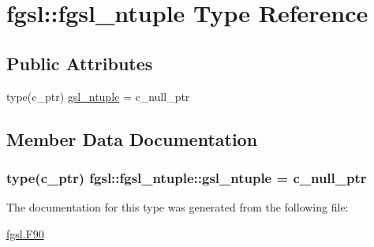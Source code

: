 \hypertarget{structfgsl_1_1fgsl__ntuple}{\section{fgsl\-:\-:fgsl\-\_\-ntuple Type Reference}
\label{structfgsl_1_1fgsl__ntuple}
}
\subsection*{Public Attributes}
\begin{DoxyCompactItemize}
\item 
type(c\-\_\-ptr) \hyperlink{structfgsl_1_1fgsl__ntuple_a31e0903a9dba6912a095ff146a167722}{gsl\-\_\-ntuple} = c\-\_\-null\-\_\-ptr
\end{DoxyCompactItemize}


\subsection{Member Data Documentation}
\hypertarget{structfgsl_1_1fgsl__ntuple_a31e0903a9dba6912a095ff146a167722}{
\subsubsection[{gsl\-\_\-ntuple}]{\setlength{\rightskip}{0pt plus 5cm}type(c\-\_\-ptr) fgsl\-::fgsl\-\_\-ntuple\-::gsl\-\_\-ntuple = c\-\_\-null\-\_\-ptr}}\label{structfgsl_1_1fgsl__ntuple_a31e0903a9dba6912a095ff146a167722}


The documentation for this type was generated from the following file\-:\begin{DoxyCompactItemize}
\item 
\hyperlink{fgsl_8F90}{fgsl.\-F90}\end{DoxyCompactItemize}

